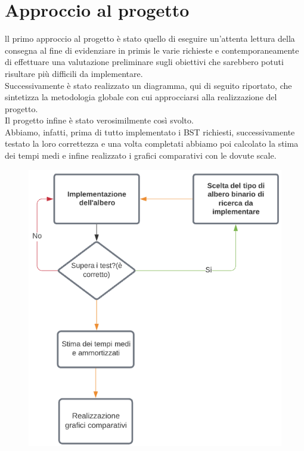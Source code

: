 \documentclass[a4paper,11pt]{report}
\begin{document}
    \chapter{Approccio al progetto}
    ll primo approccio al progetto è stato quello di eseguire un'attenta lettura della consegna al fine di evidenziare in primis le varie richieste e contemporaneamente di effettuare una valutazione preliminare sugli obiettivi che sarebbero potuti risultare più difficili da implementare.\vspace{2mm}
    \\Successivamente è stato realizzato un diagramma, qui di seguito riportato, che sintetizza la metodologia globale con cui approcciarsi alla realizzazione del progetto.
    \\Il progetto infine è stato verosimilmente così svolto.
    \\Abbiamo, infatti, prima di tutto implementato i BST richiesti, successivamente testato la loro correttezza e una volta completati abbiamo poi calcolato la stima dei tempi medi e infine realizzato i grafici comparativi con le dovute scale.
    \begin{figure}[h!]
        \begin{center}
            \includegraphics[width=120mm]{img/APP1}\\
        \end{center}
    \end{figure}
\end{document}
